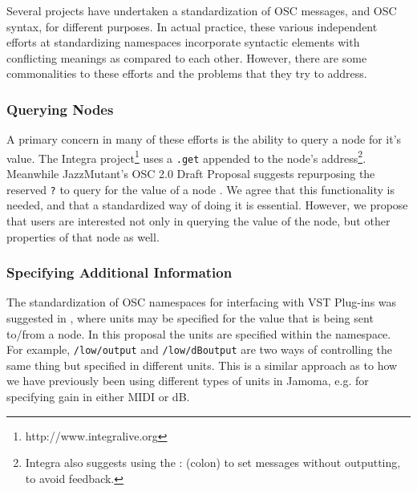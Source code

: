 \documentclass{NIME-alternate}
\begin{document}


Several projects have undertaken a standardization of OSC messages, and OSC syntax, for different purposes. In actual practice, these various independent efforts at standardizing namespaces incorporate syntactic elements with conflicting meanings as compared to each other. However, there are some commonalities to these efforts and the problems that they try to address.

\subsubsection{Querying Nodes}
A primary concern in many of these efforts is the ability to query a node for it's value. The Integra project\footnote{http://www.integralive.org} uses a \texttt{.get} appended to the node's address\footnote{Integra also suggests using the : (colon) to set messages without outputting, to avoid feedback.}. Meanwhile JazzMutant's OSC 2.0 Draft Proposal suggests repurposing the reserved \texttt{?} to query for the value of a node \cite{Jazzmutant:2006}\cite{Jazzmutant:2007}. We agree that this functionality is needed, and that a standardized way of doing it is essential.  However, we propose that users are interested not only in querying the value of the node, but other properties of that node as well.

\subsubsection{Specifying Additional Information}
The standardization of OSC namespaces for interfacing with VST Plug-ins was suggested in \cite{Zbyszynski:2005}, where units may be specified for the value that is being sent to/from a node.  In this proposal the units are specified within the namespace.  For example, \texttt{/low/output} and \texttt{/low/dBoutput} are two ways of controlling the same thing but specified in different units. This is a similar approach as to how we have previously been using different types of units in Jamoma, e.g. for specifying gain in either MIDI or dB. 
\end{document}
